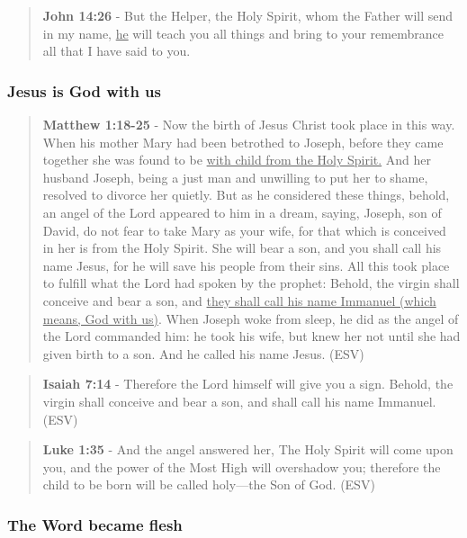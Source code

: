 \documentclass[11pt]{article}
\begin{document}
\begin{quote}
\textbf{John 14:26} - But the Helper, the Holy Spirit, whom the Father will send in my name, \uline{he} will teach you all things and bring to your remembrance all that I have said to you.
\end{quote}

\subsubsection{Jesus is God with us}
\label{sec:org52be8c0}
\begin{quote}
\textbf{Matthew 1:18-25} - Now the birth of Jesus Christ took place in this way. When his mother Mary had been betrothed to Joseph, before they came together she was found to be \uline{with child from the Holy Spirit.} And her husband Joseph, being a just man and unwilling to put her to shame, resolved to divorce her quietly. But as he considered these things, behold, an angel of the Lord appeared to him in a dream, saying, Joseph, son of David, do not fear to take Mary as your wife, for that which is conceived in her is from the Holy Spirit. She will bear a son, and you shall call his name Jesus, for he will save his people from their sins. All this took place to fulfill what the Lord had spoken by the prophet: Behold, the virgin shall conceive and bear a son, and \uline{they shall call his name Immanuel (which means, God with us)}. When Joseph woke from sleep, he did as the angel of the Lord commanded him: he took his wife, but knew her not until she had given birth to a son. And he called his name Jesus. (ESV)
\end{quote}

\begin{quote}
\textbf{Isaiah 7:14} - Therefore the Lord himself will give you a sign. Behold, the virgin shall conceive and bear a son, and shall call his name Immanuel. (ESV)
\end{quote}

\begin{quote}
\textbf{Luke 1:35} - And the angel answered her, The Holy Spirit will come upon you, and the power of the Most High will overshadow you; therefore the child to be born will be called holy—the Son of God. (ESV)
\end{quote}

\subsubsection{The Word became flesh}
\label{sec:orgf1aae49}
\end{document}

